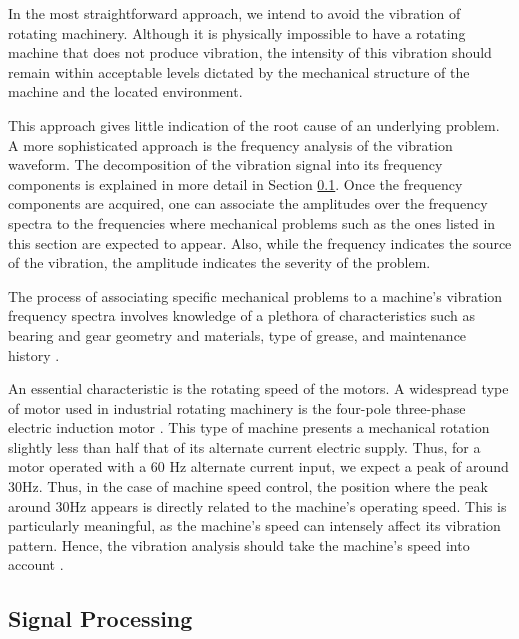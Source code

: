 \documentclass[conference]{IEEEtran}
\begin{document}

In the most straightforward approach, we intend to avoid the vibration of rotating machinery. Although it is physically impossible to have a rotating machine that does not produce vibration, the intensity of this vibration should remain within acceptable levels dictated by the mechanical structure of the machine and the located environment.

This approach gives little indication of the root cause of an underlying problem. A more sophisticated approach is the frequency analysis of the vibration waveform. The decomposition of the vibration signal into its frequency components is explained in more detail in Section \ref{sec_signal_processing}. Once the frequency components are acquired, one can associate the amplitudes over the frequency spectra to the frequencies where mechanical problems such as the ones listed in this section are expected to appear. Also, while the frequency indicates the source of the vibration, the amplitude indicates the severity of the problem.

The process of associating specific mechanical problems to a machine’s vibration frequency spectra involves knowledge of a plethora of characteristics such as bearing and gear geometry and materials, type of grease, and maintenance history \cite{b1}.

An essential characteristic is the rotating speed of the motors. A widespread type of motor used in industrial rotating machinery is the four-pole three-phase electric induction motor \cite{b2}. This type of machine presents a mechanical rotation slightly less than half that of its alternate current electric supply. Thus, for a motor operated with a 60 Hz alternate current input, we expect a peak of around 30Hz. Thus, in the case of machine speed control, the position where the peak around 30Hz appears is directly related to the machine's operating speed. This is particularly meaningful, as the machine’s speed can intensely affect its vibration pattern. Hence, the vibration analysis should take the machine’s speed into account \cite{b3}.


\subsection{Signal Processing}
\label{sec_signal_processing}
\end{document}
